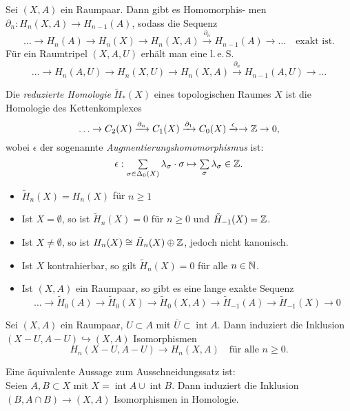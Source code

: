 \documentclass{cheat-sheet}
\newcommand{\RH}{\tilde{H}} %
\DeclareMathOperator{\inte}{int} %
\newcommand{\clos}[1]{\overline{#1}} %
\newcommand{\leS}{l.\,e.\,S.} %
\begin{document}
\begin{kor}
  Sei $(X, A)$ ein Raumpaar. Dann gibt es Homomorphis- men $\partial_n : H_n(X, A) \to H_{n-1}(A)$, sodass die Sequenz
  \[
    \ldots \to H_n(A) \to H_n(X) \to H_n(X, A) \xrightarrow{\partial_n} H_{n-1}(A) \to \ldots
    \quad \text{exakt ist.}
  \]
  Für ein Raumtripel $(X, A, U)$ erhält man eine \leS{}
  \[
    \ldots \to H_n(A, U) \to H_n(X, U) \to H_n(X, A) \xrightarrow{\partial_n} H_{n-1}(A, U) \to \ldots
  \]
\end{kor}

\begin{defn}
  Die \emph{reduzierte Homologie} $\RH_*(X)$ eines topologischen Raumes $X$ ist die Homologie des Kettenkomplexes
  \[ \ldots \to C_2(X) \xrightarrow{\partial_n} C_1(X) \xrightarrow{\partial_1} C_0(X) \xrightarrow{\epsilon} \to \mathbb{Z} \to 0, \]
  wobei $\epsilon$ der sogenannte \emph{Augmentierungshomomorphismus} ist:
  \[ \epsilon : \sum_{\sigma \in \Delta_0(X)} \lambda_\sigma \cdot \sigma \mapsto \sum_{\sigma} \lambda_\sigma \in \Z. \]
\end{defn}

\begin{prop}
  \begin{itemize}
    \item $\RH_n(X) = H_n(X)$ für $n \geq 1$
    \item Ist $X = \emptyset$, so ist $\RH_n(X) = 0$ für $n \geq 0$ und $\RH_{-1}(X) = \Z$.
    \item Ist $X \not= \emptyset$, so ist $H_n(X) \cong \RH_n(X) \oplus \Z$, jedoch nicht kanonisch.
    \item Ist $X$ kontrahierbar, so gilt $\RH_n(X) = 0$ für alle $n \in \mathbb{N}$.
    \item Ist $(X, A)$ ein Raumpaar, so gibt es eine lange exakte Sequenz
    \[ \ldots \to \RH_0(A) \to \RH_0(X) \to \RH_0(X,A) \to \RH_{-1}(A) \to \RH_{-1}(X) \to 0 \]
  \end{itemize}
\end{prop}


\begin{satz}
  Sei $(X, A)$ ein Raumpaar, $U \subset A$ mit $\clos{U} \subset \inte A$. Dann induziert die Inklusion $(X - U, A - U) \hookrightarrow (X, A)$ Isomorphismen
  \[ H_n(X - U, A - U) \to H_n(X, A) \quad \text{für alle $n \geq 0$.} \]
\end{satz}

\begin{bem}
  Eine äquivalente Aussage zum Ausschneidungssatz ist:\\
  Seien $A, B \subset X$ mit $X = \inte A \cup \inte B$. Dann induziert die Inklusion $(B, A \cap B) \to (X, A)$ Isomorphismen in Homologie.
\end{bem}
\end{document}
